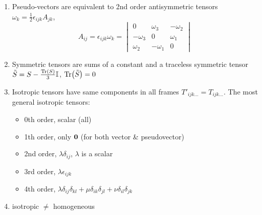 \documentclass{article}
\theoremstyle{remark}
\theoremstyle{remark}
\begin{document}
\begin{enumerate}
        \item Pseudo-vectors are equivalent to 2nd order antisymmetric tensors $\omega_k=\frac{1}{2}\epsilon_{ijk}A_{jk}$, \[A_{ij}=\epsilon_{ijk}\omega_k = \begin{vmatrix}
            0 & \omega_3 & -\omega_2\\
            -\omega_3 & 0 & \omega_1\\
            \omega_2 & -\omega_1 & 0
        \end{vmatrix}\]
        \item Symmetric tensors are sums of a constant and a traceless symmetric tensor $\tilde{S}=S-\frac{\Tr(S)}{3}\mathbb{I}$, $\Tr(\tilde{S})=0$
        \item Isotropic tensors have same components in all frames $\boxed{T'_{ijk\ldots}=T_{ijk\ldots}}$. The most general isotropic tensors:\begin{itemize}
            \item 0th order, scalar (all)
            \item 1th order, only $\vb{0}$ (for both vector \& pseudovector)
            \item 2nd order, $\lambda\delta_{ij}$, $\lambda$ is a scalar
            \item 3rd order, $\lambda\epsilon_{ijk}$
            \item 4th order, $\lambda\delta_{ij}\delta_{kl}+\mu\delta_{ik}\delta_{jl}+\nu\delta_{il}\delta_{jk}$
        \end{itemize}
        \item isotropic $\neq$ homogeneous
    \end{enumerate}
\end{document}
